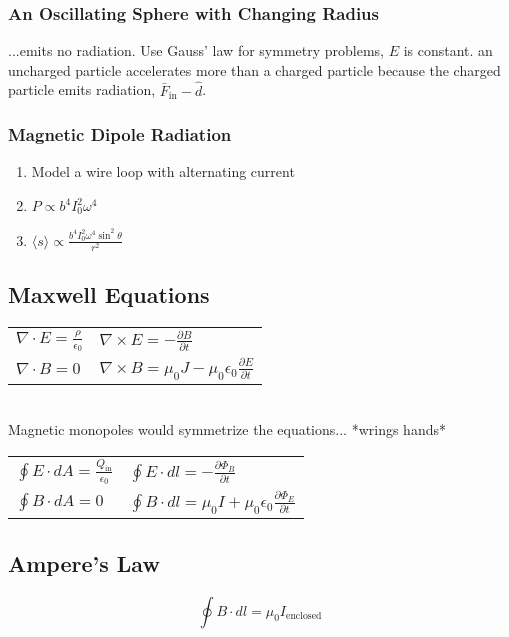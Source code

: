 \documentclass[10pt,a4paper]{article}
\begin{document}
\subsubsection{An Oscillating Sphere with Changing Radius}
...emits no radiation. Use Gauss' law for symmetry problems, $E$ is constant. an uncharged particle accelerates more than a charged particle because the charged particle emits radiation, $\bar{F}_{\textrm{in}} -\hat{d}$.

\subsubsection{Magnetic Dipole Radiation}
\begin{enumerate}
    \item Model a wire loop with alternating current
    \item $P \propto b^4 I_0^2 \omega^4$
    \item $\langle s \rangle \propto \frac{b^4 I_0^2 \omega^4 \sin^2 \theta}{r^2}$
\end{enumerate}

\subsection{Maxwell Equations}
\begin{tabular}{l l}
$\nabla \cdot E = \frac{\rho}{\epsilon_0}$ & $\nabla \times E = - \frac{\partial B}{\partial t }$\\
$\nabla \cdot B = 0$ & $\nabla \times B = \mu_0J-\mu_0\epsilon_0 \frac{\partial E}{\partial t}$
\end{tabular}\\
Magnetic monopoles would symmetrize the equations... *wrings hands*\\

\begin{tabular}{l l}
$\oint E \cdot dA = \frac{Q_{\textrm{in}}}{\epsilon_0}$ & $\oint E \cdot dl = - \frac{\partial \Phi_B}{\partial t}$\\
$\oint B \cdot dA = 0$ & $\oint B \cdot dl = \mu_0 I + \mu_0 \epsilon_0 \frac{\partial \Phi_E}{\partial t}$
\end{tabular}

\subsection{Ampere's Law}
\begin{equation}
 \oint B \cdot dl = \mu_0 I_{\textrm{enclosed}} 
\end{equation}
\end{document}
